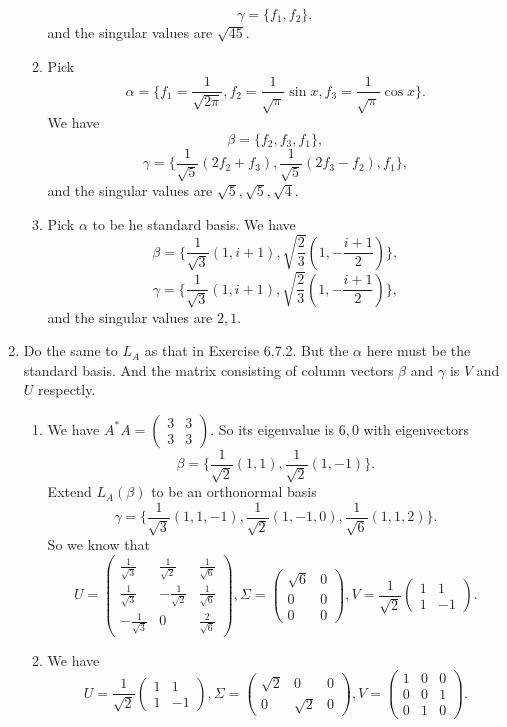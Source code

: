 \begin{enumerate}
\begin{enumerate}
\[\gamma =\{f_1,f_2\},\]
and the singular values are $\sqrt{45}$.
\item Pick 
\[\alpha =\{f_1=\frac{1}{\sqrt{2\pi}},f_2=\frac{1}{\sqrt{\pi}}\sin x,f_3=\frac{1}{\sqrt{\pi}}\cos x\}.\]
We have 
\[\beta =\{f_2,f_3,f_1\},\]
\[\gamma =\{\frac{1}{\sqrt{5}}(2f_2+f_3),\frac{1}{\sqrt{5}}(2f_3-f_2),f_1\},\]
and the singular values are $\sqrt{5},\sqrt{5},\sqrt{4}$.
\item Pick $\alpha $ to be he standard basis. We have  
\[\beta =\{\frac{1}{\sqrt{3}}(1,i+1),\sqrt{\frac{2}{3}}(1,-\frac{i+1}{2})\},\]
\[\gamma =\{\frac{1}{\sqrt{3}}(1,i+1),\sqrt{\frac{2}{3}}(1,-\frac{i+1}{2})\},\]
and the singular values are $2,1$.
\end{enumerate}
\item Do the same to $L_A$ as that in Exercise 6.7.2. But the $\alpha $ here must be the standard basis. And the matrix consisting of column vectors $\beta $ and $\gamma $ is $V$ and $U$ respectly. \begin{enumerate}
\item We have $A^*A=\begin{pmatrix}3&3\\3&3\end{pmatrix}$. So its eigenvalue is $6,0$ with eigenvectors 
\[\beta =\{\frac{1}{\sqrt{2}}(1,1),\frac{1}{\sqrt{2}}(1,-1)\}.\]
Extend $L_A(\beta)$ to be an orthonormal basis 
\[\gamma =\{\frac{1}{\sqrt{3}}(1,1,-1),\frac{1}{\sqrt{2}}(1,-1,0),\frac{1}{\sqrt{6}}(1,1,2)\}.\]
So we know that 
\[U=\begin{pmatrix}\frac{1}{\sqrt{3}}&\frac{1}{\sqrt{2}}&\frac{1}{\sqrt{6}}\\\frac{1}{\sqrt{3}}&-\frac{1}{\sqrt{2}}&\frac{1}{\sqrt{6}}\\-\frac{1}{\sqrt{3}}&0&\frac{2}{\sqrt{6}}\end{pmatrix} ,\Sigma =\begin{pmatrix}\sqrt{6}&0\\0&0\\0&0\end{pmatrix},V=\frac{1}{\sqrt{2}}\begin{pmatrix}1&1\\1&-1\end{pmatrix}.\]
\item We have 
\[U=\frac{1}{\sqrt{2}}\begin{pmatrix}1&1\\1&-1\end{pmatrix} ,\Sigma =\begin{pmatrix}\sqrt{2}&0&0\\0&\sqrt{2}&0\end{pmatrix},V=\begin{pmatrix}1&0&0\\0&0&1\\0&1&0\end{pmatrix}.\]

\end{enumerate}
\end{enumerate}
